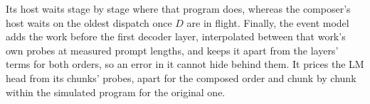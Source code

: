 Its host waits stage by stage where that program does, whereas the composer's host waits on the oldest dispatch once $D$ are in flight.
Finally, the event model adds the work before the first decoder layer, interpolated between that work's own probes at measured prompt lengths, and keeps it apart from the layers' terms for both orders, so an error in it cannot hide behind them.
It prices the LM head from its chunks' probes, apart for the composed order and chunk by chunk within the simulated program for the original one.

